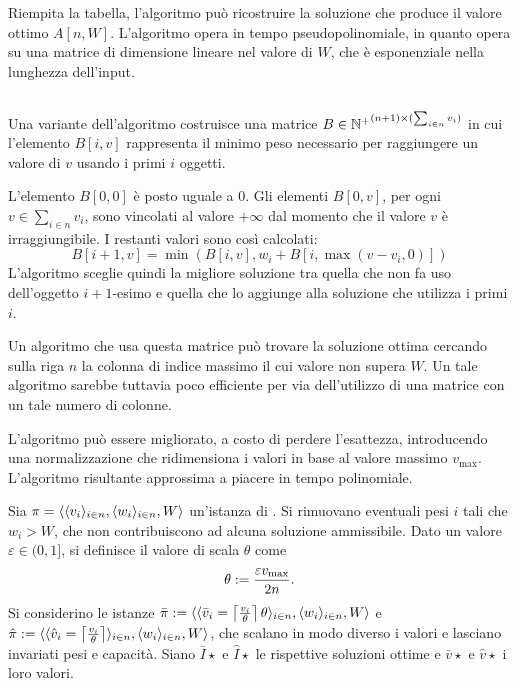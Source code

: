 Riempita la tabella, l'algoritmo può ricostruire la soluzione che produce il valore ottimo $A[n,W]$.
L'algoritmo opera in tempo pseudopolinomiale, in quanto opera su una matrice di dimensione lineare nel valore di $W$, che è esponenziale nella lunghezza dell'input.


\subsection{\WeightDynamicKnapsack}
Una variante dell'algoritmo \DynamicKnapsack costruisce una matrice $B\in{\mathbb N^+}^{(n+1)\times (\sum_{i\in n} v_i)}$ in cui l'elemento $B[i,v]$ rappresenta il minimo peso necessario per raggiungere un valore di $v$ usando i primi $i$ oggetti.

L'elemento $B[0,0]$ è posto uguale a $0$. Gli elementi $B[0,v]$, per ogni $v\in\sum_{i\in n} v_i$, sono vincolati al valore $+\infty$ dal momento che il valore $v$ è irraggiungibile. I restanti valori sono così calcolati:
\begin{equation*}
	B[i+1,v] = \min(B[i,v], w_i+B[i,\max(v-v_i,0)])
\end{equation*}
L'algoritmo sceglie quindi la migliore soluzione tra quella che non fa uso dell'oggetto $i+1$-esimo e quella che lo aggiunge alla soluzione che utilizza i primi $i$.

Un algoritmo che usa questa matrice può trovare la soluzione ottima cercando sulla riga $n$ la colonna di indice massimo il cui valore non supera $W$. Un tale algoritmo sarebbe tuttavia poco efficiente per via dell'utilizzo di una matrice con un tale numero di colonne.

L'algoritmo può essere migliorato, a costo di perdere l'esattezza, introducendo una normalizzazione che ridimensiona i valori in base al valore massimo $v_{\max}$.
L'algoritmo risultante approssima a piacere in tempo polinomiale.

Sia $\pi=\langle \langle v_i \rangle_{i\in n},\langle w_i \rangle_{i\in n},W \rangle$ un'istanza di \Knapsack. Si rimuovano eventuali pesi $i$ tali che $w_i>W$, che non contribuiscono ad alcuna soluzione ammissibile.
Dato un valore $\varepsilon\in(0,1]$, si definisce il valore di scala $\theta$ come
\begin{equation*}
	\theta:=\frac{\varepsilon v_{\max}}{2n} \text.
\end{equation*}
Si considerino le istanze $\bar\pi:=\langle \langle \bar v_i=\left\lceil \frac{v_i}{\theta} \right\rceil\theta \rangle_{i\in n},\langle w_i \rangle_{i\in n},W \rangle$ e $\hat\pi:=\langle \langle \hat v_i=\left\lceil \frac{v_i}{\theta} \right\rceil \rangle_{i\in n},\langle w_i \rangle_{i\in n},W \rangle$, che scalano in modo diverso i valori e lasciano invariati pesi e capacità.
Siano $\bar I\star$ e $\hat I\star$ le rispettive soluzioni ottime e $\bar v\star$ e $\hat v\star$ i loro valori.

